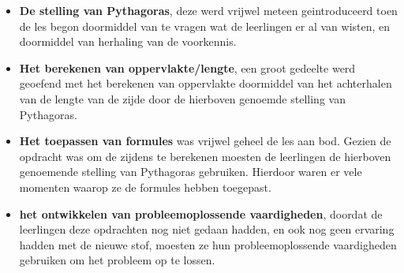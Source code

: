 \documentclass{article}
\begin{document}
\begin{enumerate}[label=(\alph*)]
\begin{itemize}
                        \item \textbf{De stelling van Pythagoras}, deze werd vrijwel meteen geintroduceerd toen de les begon doormiddel van te vragen wat de leerlingen er al van wisten, en doormiddel van herhaling van de voorkennis.
                        \item \textbf{Het berekenen van oppervlakte/lengte}, een groot gedeelte werd geoefend met het berekenen van oppervlakte doormiddel van het achterhalen van de lengte van de zijde door de hierboven genoemde stelling van Pythagoras.
                        \item \textbf{Het toepassen van formules} was vrijwel geheel de les aan bod. Gezien de opdracht was om de zijdens te berekenen moesten de leerlingen de hierboven genoemende stelling van Pythagoras gebruiken. Hierdoor waren er vele momenten waarop ze de formules hebben toegepast.
                        \item \textbf{het ontwikkelen van probleemoplossende vaardigheden}, doordat de leerlingen deze opdrachten nog niet gedaan hadden, en ook nog geen ervaring hadden met de nieuwe stof, moesten ze hun probleemoplossende vaardigheden gebruiken om het probleem op te lossen.
                    \end{itemize}
            \end{enumerate}
        \newpage
\end{document}
